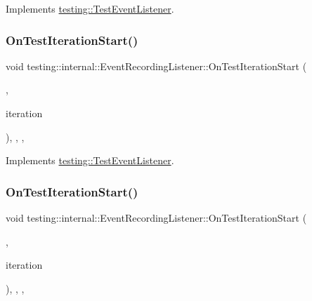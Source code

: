 Implements \mbox{\hyperlink{classtesting_1_1_test_event_listener_a550fdb3e55726e4cefa09f5697941425}{testing\+::\+Test\+Event\+Listener}}.

\mbox{\label{classtesting_1_1internal_1_1_event_recording_listener_aeed7e9302e3fc2c182a2f20c174d62b8}} 
\subsubsection{\texorpdfstring{OnTestIterationStart()}{OnTestIterationStart()}\hspace{0.1cm}{\footnotesize\ttfamily [1/3]}}
{\footnotesize\ttfamily void testing\+::internal\+::\+Event\+Recording\+Listener\+::\+On\+Test\+Iteration\+Start (\begin{DoxyParamCaption}\item[{const \mbox{\hyperlink{classtesting_1_1_unit_test}{Unit\+Test}} \&}]{,  }\item[{int}]{iteration }\end{DoxyParamCaption})\hspace{0.3cm}{\ttfamily [inline]}, {\ttfamily [override]}, {\ttfamily [protected]}, {\ttfamily [virtual]}}



Implements \mbox{\hyperlink{classtesting_1_1_test_event_listener_a60cc09b7907cb329d152eb5e7133bdeb}{testing\+::\+Test\+Event\+Listener}}.

\mbox{\label{classtesting_1_1internal_1_1_event_recording_listener_aeed7e9302e3fc2c182a2f20c174d62b8}} 
\subsubsection{\texorpdfstring{OnTestIterationStart()}{OnTestIterationStart()}\hspace{0.1cm}{\footnotesize\ttfamily [2/3]}}
{\footnotesize\ttfamily void testing\+::internal\+::\+Event\+Recording\+Listener\+::\+On\+Test\+Iteration\+Start (\begin{DoxyParamCaption}\item[{const \mbox{\hyperlink{classtesting_1_1_unit_test}{Unit\+Test}} \&}]{,  }\item[{int}]{iteration }\end{DoxyParamCaption})\hspace{0.3cm}{\ttfamily [inline]}, {\ttfamily [override]}, {\ttfamily [protected]}, {\ttfamily [virtual]}}



